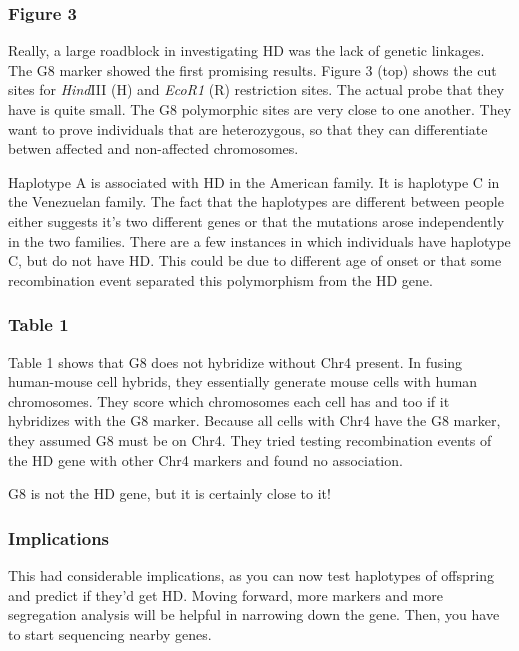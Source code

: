 \subsubsection*{Figure 3}

Really, a large roadblock in investigating HD was the lack of genetic linkages. The G8 marker showed the first promising results. Figure 3 (top) shows the cut sites for \textit{Hind}III (H) and \textit{EcoR1} (R) restriction sites. The actual probe that they have is quite small. The G8 polymorphic sites are very close to one another. They want to prove individuals that are heterozygous, so that they can differentiate betwen affected and non-affected chromosomes.\newline

Haplotype A is associated with HD in the American family. It is haplotype C in the Venezuelan family. The fact that the haplotypes are different between people either suggests it's two different genes or that the mutations arose independently in the two families. There are a few instances in which individuals have haplotype C, but do not have HD. This could be due to different age of onset or that some recombination event separated this polymorphism from the HD gene.\newline


\subsubsection*{Table 1}

Table 1 shows that G8 does not hybridize without Chr4 present. 
In fusing human-mouse cell hybrids, they essentially generate mouse cells with human chromosomes. They score which chromosomes each cell has and too if it hybridizes with the G8 marker. Because all cells with Chr4 have the G8 marker, they assumed G8 must be on Chr4. They tried testing recombination events of the HD gene with other Chr4 markers and found no association.\newline

G8 is not the HD gene, but it is certainly close to it! 

\subsubsection*{Implications} 

This had considerable implications, as you can now test haplotypes of offspring and predict if they'd get HD. Moving forward, more markers and more segregation analysis will be helpful in narrowing down the gene. Then, you have to start sequencing nearby genes.  



